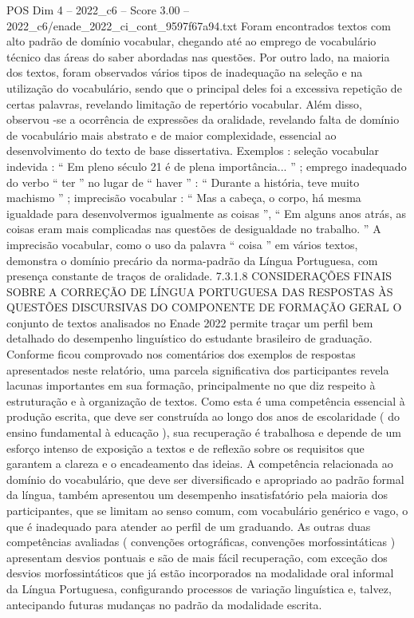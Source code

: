 \begin{textsample}{POS Dim 4 – 2022\_c6 – Score 3.00 – 2022\_c6/enade\_2022\_ci\_cont\_9597f67a94.txt}
Foram encontrados textos com alto padrão de domínio vocabular, chegando até ao emprego de vocabulário técnico das áreas do saber abordadas nas questões.
Por outro lado, na maioria dos textos, foram observados vários tipos de inadequação na seleção e na utilização do vocabulário, sendo que o principal deles foi a excessiva repetição de certas palavras, revelando limitação de repertório vocabular.
Além disso, observou -se a ocorrência de expressões da oralidade, revelando falta de domínio de vocabulário mais abstrato e de maior complexidade, essencial ao desenvolvimento do texto de base dissertativa.
Exemplos : seleção vocabular indevida : “ Em pleno século 21 é de plena importância... ” ; emprego inadequado do verbo “ ter ” no lugar de “ haver ” : “ Durante a história, teve muito machismo ” ; imprecisão vocabular : “ Mas a cabeça, o corpo, há mesma igualdade para desenvolvermos igualmente as coisas ”, “ Em alguns anos atrás, as coisas eram mais complicadas nas questões de desigualdade no trabalho. ” A imprecisão vocabular, como o uso da palavra “ coisa ” em vários textos, demonstra o domínio precário da norma-padrão da Língua Portuguesa, com presença constante de traços de oralidade. 7.3.1.8 CONSIDERAÇÕES FINAIS SOBRE A CORREÇÃO DE LÍNGUA PORTUGUESA DAS RESPOSTAS ÀS QUESTÕES DISCURSIVAS DO COMPONENTE DE FORMAÇÃO GERAL O conjunto de textos analisados no Enade 2022 permite traçar um perfil bem detalhado do desempenho linguístico do estudante brasileiro de graduação.
Conforme ficou comprovado nos comentários dos exemplos de respostas apresentados neste relatório, uma parcela significativa dos participantes revela lacunas importantes em sua formação, principalmente no que diz respeito à estruturação e à organização de textos.
Como esta é uma competência essencial à produção escrita, que deve ser construída ao longo dos anos de escolaridade ( do ensino fundamental à educação ), sua recuperação é trabalhosa e depende de um esforço intenso de exposição a textos e de reflexão sobre os requisitos que garantem a clareza e o encadeamento das ideias.
A competência relacionada ao domínio do vocabulário, que deve ser diversificado e apropriado ao padrão formal da língua, também apresentou um desempenho insatisfatório pela maioria dos participantes, que se limitam ao senso comum, com vocabulário genérico e vago, o que é inadequado para atender ao perfil de um graduando.
As outras duas competências avaliadas ( convenções ortográficas, convenções morfossintáticas ) apresentam desvios pontuais e são de mais fácil recuperação, com exceção dos desvios morfossintáticos que já estão incorporados na modalidade oral informal da Língua Portuguesa, configurando processos de variação linguística e, talvez, antecipando futuras mudanças no padrão da modalidade escrita.

\end{textsample}
